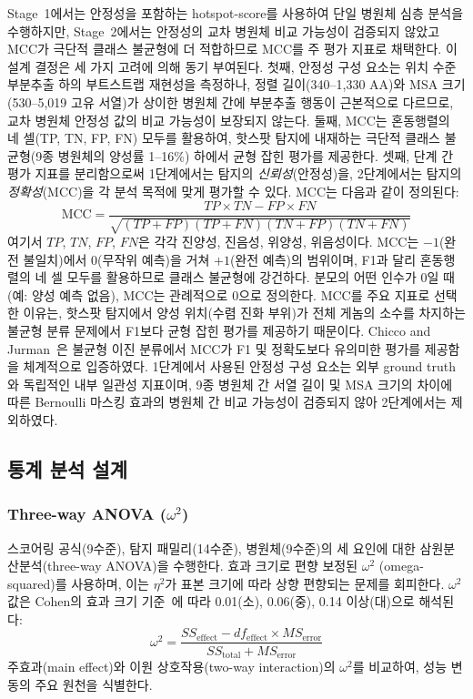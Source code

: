 Stage~1에서는 안정성을 포함하는 hotspot-score를 사용하여 단일 병원체 심층 분석을 수행하지만, Stage~2에서는 안정성의 교차 병원체 비교 가능성이 검증되지 않았고 MCC가 극단적 클래스 불균형에 더 적합하므로 MCC를 주 평가 지표로 채택한다.
이 설계 결정은 세 가지 고려에 의해 동기 부여된다.
첫째, 안정성 구성 요소는 위치 수준 부분추출 하의 부트스트랩 재현성을 측정하나, 정렬 길이(340--1,330 AA)와 MSA 크기(530--5,019 고유 서열)가 상이한 병원체 간에 부분추출 행동이 근본적으로 다르므로, 교차 병원체 안정성 값의 비교 가능성이 보장되지 않는다.
둘째, MCC는 혼동행렬의 네 셀(TP, TN, FP, FN) 모두를 활용하여, 핫스팟 탐지에 내재하는 극단적 클래스 불균형(9종 병원체의 양성률 1--16\%) 하에서 균형 잡힌 평가를 제공한다.
셋째, 단계 간 평가 지표를 분리함으로써 1단계에서는 탐지의 \textit{신뢰성}(안정성)을, 2단계에서는 탐지의 \textit{정확성}(MCC)을 각 분석 목적에 맞게 평가할 수 있다.
MCC는 다음과 같이 정의된다:
\begin{equation}
\text{MCC} = \frac{TP \times TN - FP \times FN}{\sqrt{(TP+FP)(TP+FN)(TN+FP)(TN+FN)}}
\label{eq:mcc}
\end{equation}
여기서 $TP$, $TN$, $FP$, $FN$은 각각 진양성, 진음성, 위양성, 위음성이다.
MCC는 $-1$(완전 불일치)에서 $0$(무작위 예측)을 거쳐 $+1$(완전 예측)의 범위이며, F1과 달리 혼동행렬의 네 셀 모두를 활용하므로 클래스 불균형에 강건하다.
분모의 어떤 인수가 0일 때(예: 양성 예측 없음), MCC는 관례적으로 0으로 정의한다.
MCC를 주요 지표로 선택한 이유는, 핫스팟 탐지에서 양성 위치(수렴 진화 부위)가 전체 게놈의 소수를 차지하는 불균형 분류 문제에서 F1보다 균형 잡힌 평가를 제공하기 때문이다. Chicco and Jurman~\cite{chicco2020mcc}은 불균형 이진 분류에서 MCC가 F1 및 정확도보다 유의미한 평가를 제공함을 체계적으로 입증하였다.
1단계에서 사용된 안정성 구성 요소는 외부 ground truth와 독립적인 내부 일관성 지표이며, 9종 병원체 간 서열 길이 및 MSA 크기의 차이에 따른 Bernoulli 마스킹 효과의 병원체 간 비교 가능성이 검증되지 않아 2단계에서는 제외하였다.

\subsection{통계 분석 설계}
\label{subsec:9pathogen_statistics}

\subsubsection{Three-way ANOVA ($\omega^2$)}

스코어링 공식(9수준), 탐지 패밀리(14수준), 병원체(9수준)의 세 요인에 대한 삼원분산분석(three-way ANOVA)을 수행한다.
효과 크기로 편향 보정된 $\omega^2$ (omega-squared)를 사용하며, 이는 $\eta^2$가 표본 크기에 따라 상향 편향되는 문제를 회피한다. $\omega^2$ 값은 Cohen의 효과 크기 기준~\cite{cohen1988statistical}에 따라 0.01(소), 0.06(중), 0.14 이상(대)으로 해석된다:
\begin{equation}
\omega^2 = \frac{SS_{\text{effect}} - df_{\text{effect}} \times MS_{\text{error}}}{SS_{\text{total}} + MS_{\text{error}}}
\label{eq:omega_squared}
\end{equation}
주효과(main effect)와 이원 상호작용(two-way interaction)의 $\omega^2$를 비교하여, 성능 변동의 주요 원천을 식별한다.


